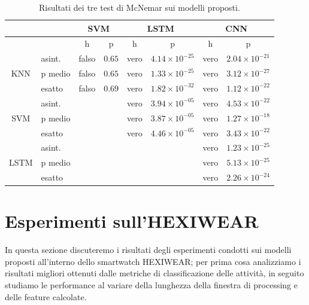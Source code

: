 \begin{table}
    \centering
    \begin{tabular}{c | l | c c | c c | c c }
        \hline
        & & \multicolumn{2}{c}{SVM} & \multicolumn{2}{c}{LSTM} & \multicolumn{2}{c}{CNN} \\
        \hline
                                &            & h     & p    & h    & p                      & h    & p \\
        \hline
        \multirow{3}{*}{KNN}    & asint.     & falso & $0.65$ & vero & $4.14 \times 10^{-25}$ & vero & $2.04 \times 10^{-21}$ \\
                                & p medio    & falso & $0.65$ & vero & $1.33 \times 10^{-25}$ & vero & $3.12 \times 10^{-27}$ \\
                                & esatto     & falso & $0.69$ & vero & $1.82 \times 10^{-32}$ & vero & $1.12 \times 10^{-22}$ \\
        \hline
        \multirow{3}{*}{SVM}    & asint.     &       &        & vero & $3.94 \times 10^{-05}$ & vero & $4.53 \times 10^{-22}$ \\
                                & p medio    &       &        & vero & $3.87 \times 10^{-05}$ & vero & $1.27 \times 10^{-18}$ \\
                                & esatto     &       &        & vero & $4.46 \times 10^{-05}$ & vero & $3.43 \times 10^{-22}$ \\
        \hline
        \multirow{3}{*}{LSTM}   & asint.     &       &        &      &                        & vero & $1.23 \times 10^{-25}$ \\
                                & p medio    &       &        &      &                        & vero & $5.13 \times 10^{-25}$ \\
                                & esatto     &       &        &      &                        & vero & $2.26 \times 10^{-24}$ \\ 
        \hline
    \end{tabular}
    \caption{Risultati dei tre test di McNemar sui modelli proposti.}
    \label{tab:mc-nemar-results}
\end{table}

\section{Esperimenti sull'HEXIWEAR}
\label{sec:esperimenti-sull-hexiwear}

In questa sezione discuteremo i risultati degli esperimenti condotti sui modelli proposti all'interno dello smartwatch HEXIWEAR; per prima cosa analizziamo i risultati migliori ottenuti dalle metriche di classificazione delle attività, in seguito studiamo le performance al variare della lunghezza della finestra di processing e delle feature calcolate.

